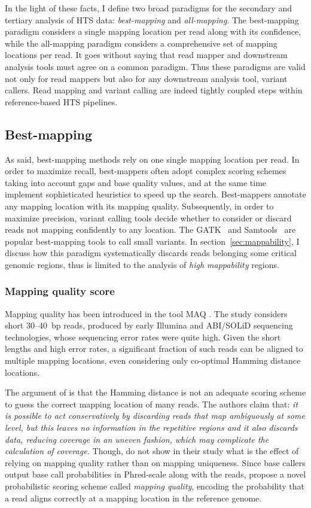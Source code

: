 In the light of these facts, I define two broad paradigms for the secondary and tertiary analysis of HTS data: \emph{best-mapping} and \emph{all-mapping}.
The best-mapping paradigm considers a single mapping location per read along with its confidence, while the all-mapping paradigm considers a comprehensive set of mapping locations per read.
It goes without saying that read mapper and downstream analysis tools must agree on a common paradigm.
Thus these paradigms are valid not only for read mappers but also for any downstream analysis tool, \eg variant callers.
Read mapping and variant calling are indeed tightly coupled steps within reference-based HTS pipelines.

\subsection{Best-mapping}
As said, best-mapping methods rely on one single mapping location per read.
In order to maximize recall, best-mappers often adopt complex scoring schemes taking into account gaps and base quality values, and at the same time implement sophisticated heuristics to speed up the search.
Best-mappers annotate any mapping location with its mapping quality.
Subsequently, in order to maximize precision, variant calling tools decide whether to consider or discard reads not mapping confidently to any location.
The GATK~\citep{DePristo2011} and Samtools~\citep{Li2009a} are popular best-mapping tools to call small variants.
In section~\ref{sec:mappability}, I discuss how this paradigm systematically discards reads belonging some critical genomic regions, thus is limited to the analysis of \emph{high mappability} regions.

\subsubsection{Mapping quality score}
\label{sec:paradigms:mapqual}

Mapping quality has been introduced in the tool MAQ \citep{Li2008}.
The study considers short 30--40~bp reads, produced by early Illumina and ABI/SOLiD sequencing technologies, whose sequencing error rates were quite high.
Given the short lengths and high error rates, a significant fraction of such reads can be aligned to multiple mapping locations, even considering only co-optimal Hamming distance locations.

The argument of \citeauthor{Li2008} is that the Hamming distance is not an adequate scoring scheme to guess the correct mapping location of many reads.
The authors claim that: \emph{it is possible to act conservatively by discarding reads that map ambiguously at some level, but this leaves no information in the repetitive regions and it also discards data, reducing coverage in an uneven fashion, which may complicate the calculation of coverage.}
Though, \citeauthor{Li2008} do not show in their study what is the effect of relying on mapping quality rather than on mapping uniqueness.
Since base callers output base call probabilities in Phred-scale along with the reads, \citeauthor{Li2008} propose a novel probabilistic scoring scheme called \emph{mapping quality}, encoding the probability that a read aligns correctly at a mapping location in the reference genome.

